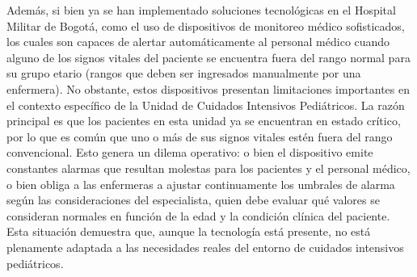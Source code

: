 Además, si bien ya se han implementado soluciones tecnológicas en el Hospital Militar de Bogotá, como el uso de dispositivos de monitoreo médico sofisticados, los cuales son capaces de alertar automáticamente al personal médico cuando alguno de los signos vitales del paciente se encuentra fuera del rango normal para su grupo etario (rangos que deben ser ingresados manualmente por una enfermera). No obstante, estos dispositivos presentan limitaciones importantes en el contexto específico de la Unidad de Cuidados Intensivos Pediátricos. La razón principal es que los pacientes en esta unidad ya se encuentran en estado crítico, por lo que es común que uno o más de sus signos vitales estén fuera del rango convencional. Esto genera un dilema operativo: o bien el dispositivo emite constantes alarmas que resultan molestas para los pacientes y el personal médico, o bien obliga a las enfermeras a ajustar continuamente los umbrales de alarma según las consideraciones del especialista, quien debe evaluar qué valores se consideran normales en función de la edad y la condición clínica del paciente. Esta situación demuestra que, aunque la tecnología está presente, no está plenamente adaptada a las necesidades reales del entorno de cuidados intensivos pediátricos.